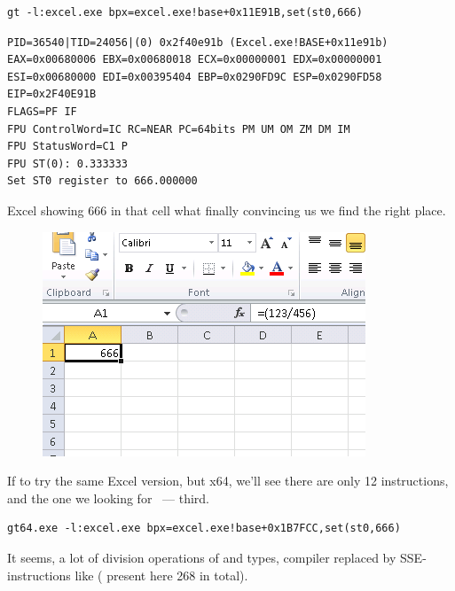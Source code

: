 \begin{lstlisting}
gt -l:excel.exe bpx=excel.exe!base+0x11E91B,set(st0,666)
\end{lstlisting}

\begin{lstlisting}
PID=36540|TID=24056|(0) 0x2f40e91b (Excel.exe!BASE+0x11e91b)
EAX=0x00680006 EBX=0x00680018 ECX=0x00000001 EDX=0x00000001
ESI=0x00680000 EDI=0x00395404 EBP=0x0290FD9C ESP=0x0290FD58
EIP=0x2F40E91B
FLAGS=PF IF
FPU ControlWord=IC RC=NEAR PC=64bits PM UM OM ZM DM IM 
FPU StatusWord=C1 P 
FPU ST(0): 0.333333
Set ST0 register to 666.000000
\end{lstlisting}

{Excel showing 666 in that cell what finally convincing us we find the right place.}

\begin{figure}[ht!]
\centering
\includegraphics[scale=0.66]{digging_into_code/Excel_prank.png}
\caption{}
\end{figure}

{If to try the same Excel version, but x64, we'll see there are only 12 \FDIV instructions,
and the one we looking for ~--- third.}

\begin{lstlisting}
gt64.exe -l:excel.exe bpx=excel.exe!base+0x1B7FCC,set(st0,666)
\end{lstlisting}

{It seems, a lot of division operations of \Tfloat and \Tdouble types, compiler replaced by SSE-instructions
like  ( present here 268 in total).}

